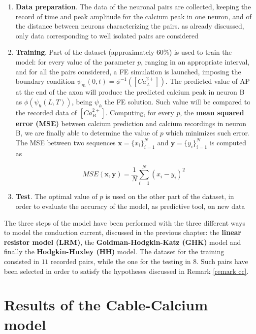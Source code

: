 \documentclass[12pt, a4paper]{report}
\begin{document}
\begin{enumerate}
	\item \textbf{Data preparation}. The data of the neuronal pairs are collected, keeping the record of time and peak amplitude for the calcium peak in one neuron, and of the distance between neurons characterizing the pairs. as already discussed, only data corresponding to well isolated pairs are considered
	
	\item \textbf{Training}. Part of the dataset (approximately $ 60 \%$) is used to train the model: for every value of the parameter $p$, ranging in an appropriate  interval, and for all the pairs considered, a  FE simulation is launched, imposing the boundary condition  $\psi_m(0,t) = \phi^{-1}([Ca^{2+}_A])$. The predicted value of AP at the end of the axon will produce the predicted calcium peak in neuron B as $\phi(\psi_h(L,T))$, being $\psi_h$ the FE solution. Such value will be compared to the recorded data of $[Ca^{2+}_B]$. Computing, for every $p$, the \textbf{mean squared error (MSE)} between calcium prediction and calcium recordings in neuron B, we are finally able to determine the value of $p$ which minimizes such error. The MSE between two sequences $\textbf{x} = \{x_i\}_{i=1}^N$ and $\textbf{y} = \{y_i\}_{i=1}^N$ is computed as
	
	\begin{equation}
	MSE(\textbf{x},\textbf{y}) = \frac{1}{N}\sum_{i=1}^{N}(x_i-y_i)^2
	\end{equation}
	
	\item \textbf{Test}. The optimal value of $p$ is used on the other part of the dataset, in order to evaluate the accuracy of the model, as predictive tool, on new data
	
\end{enumerate}




The three steps of the model have been performed with the three different ways to model the conduction current, discussed in the previous chapter:  the \textbf{linear resistor model (LRM)}, the \textbf{Goldman-Hodgkin-Katz (GHK)} model and finally the \textbf{Hodgkin-Huxley (HH)} model. The dataset for the training consisted in $11$ recorded pairs, while the one for the testing in $8$. Such pairs have been selected in order to satisfy the hypotheses discussed in Remark \ref{remark cc}.

\section{Results of the Cable-Calcium model}
\end{document}
